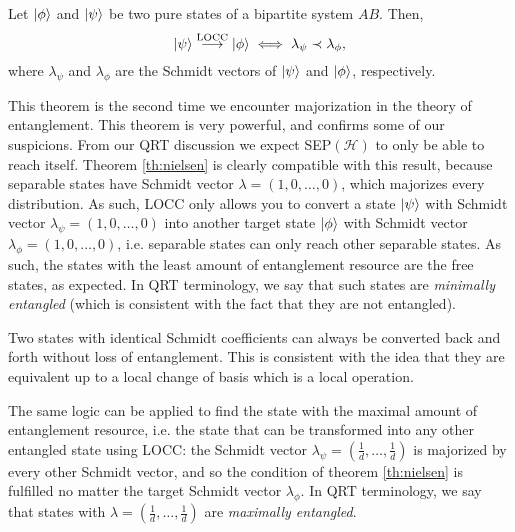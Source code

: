 \begin{theorem} \label{th:nielsen}
    Let $\ket{\phi}$ and $\ket{\psi}$ be two pure states of a bipartite system $AB$. Then,
    \begin{equation}
        \ket{\psi} \overset{\text{LOCC}}{\longrightarrow} \ket{\phi} \iff \lambda_\psi \prec \lambda_\phi,
    \end{equation}
    where $\lambda_\psi$ and $\lambda_\phi$ are the Schmidt vectors of $\ket{\psi}$ and $\ket{\phi}$, respectively.
\end{theorem}


This theorem is the second time we encounter majorization in the theory of entanglement. This theorem is very powerful, and confirms some of our suspicions. From our QRT discussion we expect SEP$(\mathcal{H})$ to only be able to reach itself. Theorem \ref{th:nielsen} is clearly compatible with this result, because separable states have Schmidt vector $\lambda = (1, 0, \dots, 0)$, which majorizes every distribution. As such, LOCC only allows you to convert a state $\ket{\psi}$ with Schmidt vector $\lambda_\psi = (1, 0, \dots, 0)$ into another target state $\ket{\phi}$ with Schmidt vector $\lambda_\phi = (1, 0, \dots, 0)$, i.e. separable states can only reach other separable states. As such, the states with the least amount of entanglement resource are the free states, as expected. In QRT terminology, we say that such states are \textit{minimally entangled} (which is consistent with the fact that they are not entangled). 

\begin{remark}
    Two states with identical Schmidt coefficients can always be converted back and forth without loss of entanglement. This is consistent with the idea that they are equivalent up to a local change of basis which is a local operation.
\end{remark}

The same logic can be applied to find the state with the maximal amount of entanglement resource, i.e. the state that can be transformed into any other entangled state using LOCC: the Schmidt vector $\lambda_\psi = \left(\frac{1}{d}, \dots, \frac{1}{d}\right)$ is majorized by every other Schmidt vector, and so the condition of theorem \ref{th:nielsen} is fulfilled no matter the target Schmidt vector $\lambda_\phi$. In QRT terminology, we say that states with $\lambda = \left(\frac{1}{d}, \dots, \frac{1}{d}\right)$ are \textit{maximally entangled}.

